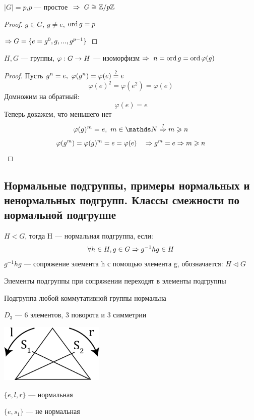 \documentclass[main]{subfiles}
\begin{document}
	\begin{utv}
	    $|G|=p$,\q $p$ --- простое $\ \Rightarrow\  G \cong \mathbb{Z} /p \mathbb{Z}$
	\end{utv}

	\begin{proof}
	    $g \in G$, $g \neq e$, $\mathop{\rm ord}\nolimits g=p$

	    $\Rightarrow G=\{e=g^0,g,...,g^{p-1}\}$
	\end{proof}

	\begin{utv}
	    $H,G$ --- группы, $\varphi: G \rightarrow H$ --- изоморфизм $\Rightarrow$ $n=\mathop{\rm ord}\nolimits g=\mathop{\rm ord}\nolimits \varphi(g)$
	\end{utv}

	\begin{proof}
	    Пусть $g^n=e,\ \varphi(g^n)=\varphi(e)\os{?}{=}e$
	    \[\varphi(e)^2=\varphi(e^2)=\varphi(e)\]
		Домножим на обратный:
		\[\varphi(e) = e\]
	    Теперь докажем, что меньшего нет
	    \[\varphi(g)^m = e,\ m \in \N \os{?}{\Ra} m \geqslant n\]
		\[\varphi(g^m) = \varphi(g)^m = e = \varphi(e) \quad \Rightarrow g^m = e \Rightarrow m \geqslant n\]
	\end{proof}

	\subsection{Нормальные подгруппы, примеры нормальных и ненормальных подгрупп. Классы смежности по нормальной подгруппе}
	\begin{definition}
	    $H<G$, тогда H --- нормальная подгруппа, если:
		\[\forall h \in H, g \in G \Rightarrow g^{-1}h g \in H\]
		$g^{-1}h g$ --- сопряжение элемента h с помощью элемента g, обозначается: $H \triangleleft G$
	\end{definition}

	\begin{remark}
	    Элементы подгруппы при сопряжении переходят в элементы подгруппы
	\end{remark}

	\begin{remark}
	    Подгруппа любой коммутативной группы нормальна
	\end{remark}

	\begin{example}
	    $D_3$ --- 6 элементов, 3 поворота и 3 симметрии

	    \includegraphics[width = 5cm]{pics/triangle_d_3.png}

	    $\{e,l,r\}$ --- нормальная

	    $\{e, s_1\}$ --- не нормальная
	\end{example}
\end{document}
